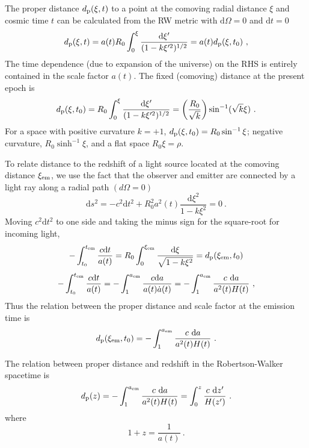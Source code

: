 \documentclass[12pt,a4paper]{article}
\newcommand{\dif}{\mathrm{d}}
\begin{document}
\cite{cheng2005relativity} The proper distance $d_{\rm p}(\xi, t)$ to a point at the comoving radial distance $\xi$ and cosmic time $t$ can be calculated from the RW metric with $\dif \Omega = 0$ and $\dif t = 0$
\begin{equation}
d_{\rm p} (\xi ,t) = a(t) R_0 \int_0^\xi \dfrac{\dif \xi^\prime}{(1-k\xi^{\prime 2})^{1/2} } = a(t) d_{\rm p}(\xi ,t_0)~,
\end{equation}
The time dependence (due to expansion of the universe) on the RHS is entirely contained in the scale factor $a(t)$. The fixed (comoving) distance at the present epoch is
\begin{equation}
d_{\rm p} (\xi ,t_0) = R_0 \int_0^\xi \dfrac{\dif \xi^\prime}{(1-k\xi^{\prime 2})^{1/2} } = \left(\dfrac{R_0}{\sqrt{k}} \right) \sin^{-1} (\sqrt{k} \xi) ~.
\end{equation}
For a space with positive curvature $k = +1$, $d_{\rm p}(\xi, t_0) = R_0 \sin^{-1} \xi$; negative curvature, $R_0 \sinh^{-1} \xi$, and a flat space $R_0 \xi = \rho$.

To relate distance to the redshift of a light source located at the comoving distance $\xi_{\rm em}$, we use the fact that the observer and emitter are connected by a light ray along a radial path $(d\Omega = 0)$
\begin{equation}
\dif s^2 = -c^2 \dif t^2 +R_0^2 a^2(t) \dfrac{\dif \xi^2}{1-k \xi^2} = 0 ~.
\end{equation}
Moving $c^2\dif t^2$ to one side and taking the minus sign for the square-root for incoming light, 
\begin{equation}
-\int_{t_0}^{t_{\rm em}} \dfrac{c\dif t}{a(t) } = R_0 \int_0^{\xi_{\rm em}} \dfrac{\dif \xi}{\sqrt{1-k \xi^2} } = d_{\rm p}(\xi_{\rm em}, t_0)
\end{equation}
\begin{equation}
-\int_{t_0}^{t_{\rm em}} \dfrac{c\dif t}{a(t) } = -\int_1^{a_{\rm em}}  \dfrac{c\dif a}{a(t) \dot{a}(t) } = -\int_1^{a_{\rm em}} \dfrac{c~ \dif a}{a^2(t) H(t) } ~,
\end{equation}
Thus the relation between the proper distance and scale factor at the emission time is
\begin{equation}
d_{\rm p}(\xi_{\rm em}, t_0) = -\int_1^{a_{\rm em}} \dfrac{c~ \dif a}{a^2(t) H(t) } ~.
\end{equation}

The relation between proper distance and redshift in the Robertson-Walker spacetime is
\begin{equation}
d_{\rm p}(z) = -\int_1^{a_{\rm em}} \dfrac{c~ \dif a}{a^2(t) H(t) } = \int_0^z \dfrac{c ~\dif z^\prime}{H(z^\prime)} ~.
\end{equation}
where
\begin{equation}
1+z  = \dfrac{1}{a(t)} ~.
\end{equation}
\end{document}
